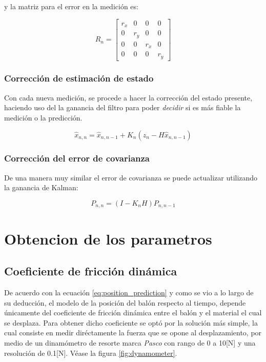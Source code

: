 y la matriz para el error en la medición es:

\begin{equation}
R_n = 
\begin{bmatrix}
r_x & 0 & 0 & 0\\ 
0 & r_y & 0 & 0\\ 
0 & 0 & r_{\dot{x}} & 0\\ 
0 & 0 & 0 & r_{\dot{y}}
\end{bmatrix}
\label{matrix:measurement_error}
\end{equation}

		\subsubsection*{Corrección de estimación de estado}
	Con cada nueva medición, se procede a hacer la corrección del estado presente, haciendo uso del la ganancia del filtro para poder \textit{decidir} si es más fiable la medición o la predicción.

\begin{equation}
\hat{x}_{n,n} = \hat{x}_{n,n-1} + K_n(z_n - H \hat{x}_{n,n-1})
\end{equation}
	
		\subsubsection*{Corrección del error de covarianza}
	De una manera muy similar el error de covarianza se puede actualizar utilizando la ganancia de Kalman:

\begin{equation}
P_{n,n} = (I - K_n H) P_{n,n-1}
\end{equation}

	\section{Obtencion de los parametros}
		\subsection*{Coeficiente de fricción dinámica}
	De acuerdo con la ecuación \ref{eq:position_prediction} y como se vio a lo largo de su deducción, el modelo de la posición del balón respecto al tiempo, depende únicamente del coeficiente de fricción dinámica entre el balón y el material el cual se desplaza. Para obtener dicho coeficiente se optó por la solución más simple, la cual consiste en medir diréctamente la fuerza que se opone al desplazamiento, por medio de un dinamómetro de resorte marca \textit{Pasco} con rango de 0 a 10[N] y una resolución de 0.1[N]. Véase la figura \ref{fig:dynamometer}. 
	
